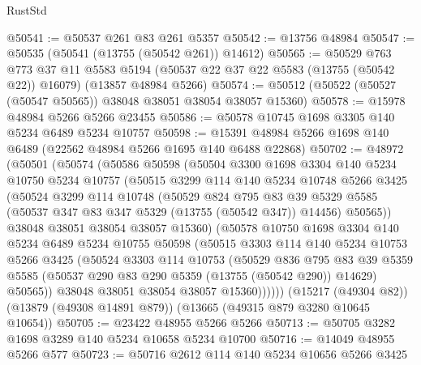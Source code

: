 \begin{lexlean}{RustStd}
\begin{coremodule}
@50541 := @50537 @261 @83 @261 @5357
@50542 := @13756 @48984
@50547 := @50535 (@50541 (@13755 (@50542 @261)) @14612)
@50565 := @50529
    @763
    @773
    @37
    @11
    @5583
    @5194
    (@50537 @22 @37 @22 @5583 (@13755 (@50542 @22)) @16079)
    (@13857 @48984 @5266)
@50574 := @50512 (@50522 (@50527 (@50547 @50565)) @38048 @38051 @38054 @38057 @15360)
@50578 := @15978 @48984 @5266 @5266 @23455
@50586 := @50578 @10745 @1698 @3305 @140 @5234 @6489 @5234 @10757
@50598 := @15391 @48984 @5266 @1698 @140 @6489 (@22562 @48984 @5266 @1695 @140 @6488 @22868)
@50702 := @48972
    (@50501
      (@50574
        (@50586
          @50598
          (@50504
            @3300
            @1698
            @3304
            @140
            @5234
            @10750
            @5234
            @10757
            (@50515
              @3299
              @114
              @140
              @5234
              @10748
              @5266
              @3425
              (@50524
                @3299
                @114
                @10748
                (@50529
                  @824
                  @795
                  @83
                  @39
                  @5329
                  @5585
                  (@50537 @347 @83 @347 @5329 (@13755 (@50542 @347)) @14456)
                  @50565))
              @38048
              @38051
              @38054
              @38057
              @15360)
            (@50578
              @10750
              @1698
              @3304
              @140
              @5234
              @6489
              @5234
              @10755
              @50598
              (@50515
                @3303
                @114
                @140
                @5234
                @10753
                @5266
                @3425
                (@50524
                  @3303
                  @114
                  @10753
                  (@50529
                    @836
                    @795
                    @83
                    @39
                    @5359
                    @5585
                    (@50537 @290 @83 @290 @5359 (@13755 (@50542 @290)) @14629)
                    @50565))
                @38048
                @38051
                @38054
                @38057
                @15360))))))
    (@15217 (@49304 @82))
    (@13879 (@49308 @14891 @879))
    (@13665 (@49315 @879 @3280 @10645 @10654))
@50705 := @23422 @48955 @5266 @5266
@50713 := @50705 @3282 @1698 @3289 @140 @5234 @10658 @5234 @10700
@50716 := @14049 @48955 @5266 @577
@50723 := @50716 @2612 @114 @140 @5234 @10656 @5266 @3425

\end{coremodule}
\end{lexlean}
